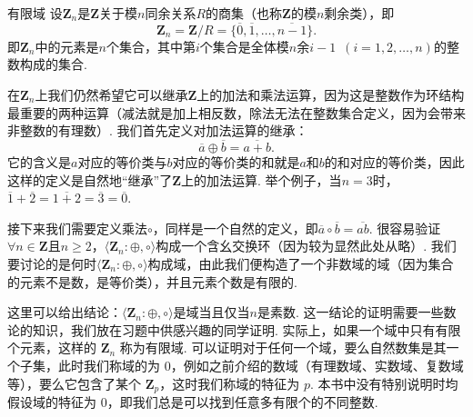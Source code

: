 \begin{example}{}{有限域}
    设$\mathbf{Z}_n$是$\mathbf{Z}$关于模$n$同余关系$R$的商集（也称$\mathbf{Z}$的模$n$剩余类），即
    \[\mathbf{Z}_n=\mathbf{Z}/R=\{\overline{0},\overline{1},\ldots,\overline{n-1}\}.\]
    即$\mathbf{Z}_n$中的元素是$n$个集合，其中第$i$个集合是全体模$n$余$i-1\enspace(i=1,2,\ldots,n)$的整数构成的集合.

    在$\mathbf{Z}_n$上我们仍然希望它可以继承$\mathbf{Z}$上的加法和乘法运算，因为这是整数作为环结构最重要的两种运算（减法就是加上相反数，除法无法在整数集合定义，因为会带来非整数的有理数）. 我们首先定义对加法运算的继承：
    \[\overline{a}\oplus\overline{b}=\overline{a+b}.\]
    它的含义是$a$对应的等价类与$b$对应的等价类的和就是$a$和$b$的和对应的等价类，因此这样的定义是自然地``继承''了$\mathbf{Z}$上的加法运算. 举个例子，当$n=3$时，$\overline{1}+\overline{2}=\overline{1+2}=\overline{3}=\overline{0}$.

    接下来我们需要定义乘法$\circ$，同样是一个自然的定义，即$\overline{a}\circ\overline{b}=\overline{ab}$. 很容易验证$\forall n\in\mathbf{Z}$且$n\geqslant 2$，$\langle \mathbf{Z}_n\colon\oplus,\circ\rangle$构成一个含幺交换环（因为较为显然此处从略）. 我们要讨论的是何时$\langle \mathbf{Z}_n\colon\oplus,\circ\rangle$构成域，由此我们便构造了一个非数域的域（因为集合的元素不是数，是等价类），并且元素个数是有限的.

    这里可以给出结论：$\langle \mathbf{Z}_n\colon\oplus,\circ\rangle$是域当且仅当$n$是素数. 这一结论的证明需要一些数论的知识，我们放在习题中供感兴趣的同学证明. 实际上，如果一个域中只有有限个元素，这样的 $\mathbf{Z}_n$ 称为有限域. 可以证明对于任何一个域，要么自然数集是其一个子集，此时我们称域的为 $0$，例如之前介绍的数域（有理数域、实数域、复数域等），要么它包含了某个 $\mathbf{Z}_p$，这时我们称域的特征为 $p$. 本书中没有特别说明时均假设域的特征为 $0$，即我们总是可以找到任意多有限个的不同整数.
\end{example}

